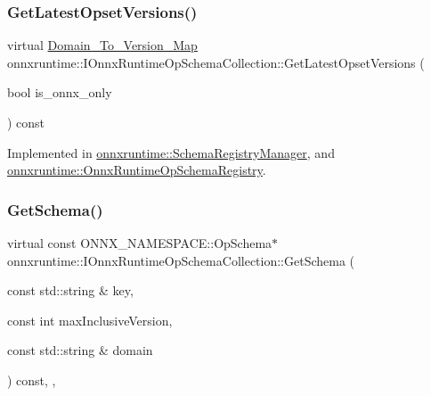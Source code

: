 \subsubsection{\texorpdfstring{Get\+Latest\+Opset\+Versions()}{GetLatestOpsetVersions()}}
{\footnotesize\ttfamily virtual \mbox{\hyperlink{namespaceonnxruntime_ab773a024322804641f5eb4964e3471d6}{Domain\+\_\+\+To\+\_\+\+Version\+\_\+\+Map}} onnxruntime\+::\+I\+Onnx\+Runtime\+Op\+Schema\+Collection\+::\+Get\+Latest\+Opset\+Versions (\begin{DoxyParamCaption}\item[{bool}]{is\+\_\+onnx\+\_\+only }\end{DoxyParamCaption}) const\hspace{0.3cm}{\ttfamily [pure virtual]}}



Implemented in \mbox{\hyperlink{classonnxruntime_1_1SchemaRegistryManager_a29610465c48d72b297860e28a2d73602}{onnxruntime\+::\+Schema\+Registry\+Manager}}, and \mbox{\hyperlink{classonnxruntime_1_1OnnxRuntimeOpSchemaRegistry_a862d1ac6dbd221ab94d6db030f6f1c52}{onnxruntime\+::\+Onnx\+Runtime\+Op\+Schema\+Registry}}.

\mbox{\label{classonnxruntime_1_1IOnnxRuntimeOpSchemaCollection_aebb95e90aa451584b39a50d07f87839f}} 
\subsubsection{\texorpdfstring{Get\+Schema()}{GetSchema()}}
{\footnotesize\ttfamily virtual const O\+N\+N\+X\+\_\+\+N\+A\+M\+E\+S\+P\+A\+C\+E\+::\+Op\+Schema$\ast$ onnxruntime\+::\+I\+Onnx\+Runtime\+Op\+Schema\+Collection\+::\+Get\+Schema (\begin{DoxyParamCaption}\item[{const std\+::string \&}]{key,  }\item[{const int}]{max\+Inclusive\+Version,  }\item[{const std\+::string \&}]{domain }\end{DoxyParamCaption}) const\hspace{0.3cm}{\ttfamily [inline]}, {\ttfamily [final]}, {\ttfamily [virtual]}}

